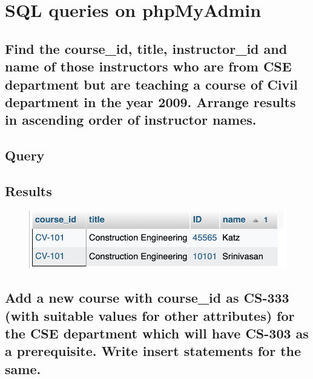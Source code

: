 \documentclass[12pt]{article}
\begin{document}
\newpage


\newpage
\section{SQL queries on phpMyAdmin}

\subsection{Find the course\_id, title, instructor\_id and name of those instructors who are from CSE department but are teaching a course of Civil department in the year 2009. Arrange results in ascending order of instructor names.}

\subsection*{Query}

\subsection*{Results}
\begin{figure}[!hbt]
    \centering
    \includegraphics[scale=1.2]{screenshots/8a.png}
    \label{fig:my_label1}
\end{figure}
\newpage

\subsection{Add a new course with course\_id as CS-333 (with suitable values for other attributes) for the CSE department which will have CS-303 as a prerequisite. Write insert statements for the same.}
\end{document}
